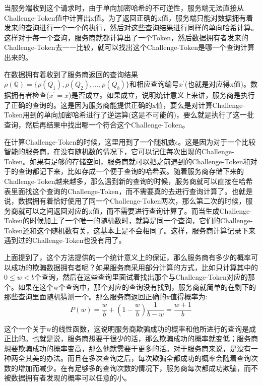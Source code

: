 当服务端收到这个请求时，由于单向加密哈希的不可逆性，服务端无法直接从Challenge-Token值中计算出x值。为了返回正确的x值，服务端只能对数据拥有着发来的查询进行一个一个的执行，然后对这些查询结果进行同样的单向哈希计算。这样对于每一个查询，服务商就都计算出了一个Token，然后数据拥有者发来的Challenge-Token去一一比较，就可以找出这个Challenge-Token是哪一个查询计算出来的。

在数据拥有着收到了服务商返回的查询结果$\rho(\mathbb{Q}) = \{\rho(Q_1), \rho(Q_2), ..., \rho(Q_b)\}$和相应查询编号$x^\prime$(也就是对应得x值)。数据拥有者检查($x^\prime = x$)是否成立。如果成立，说明统计意义上来讲，服务商是执行了正确的查询的。这是因为服务商能提供正确的x值，要么是对计算Challenge-Token用到的单向加密哈希进行了逆运算(这是不可能的)，要么就是执行了这一批查询，然后再结果中找出哪一个符合这个Challenge-Token。

在计算Challenge-Token的时候，这里用到了一个随机数$\epsilon$。这是因为对于一个比较智能的服务商，在没有随机数的情况下，它可以记住每次出现的Challenge-Token。如果有足够的存储空间，服务商就可以把之前遇到的Challenge-Token和对于的查询都记下来，比如存成一个便于查询的哈希表。随着服务商存储下来的Challenge-Token越来越多，那么遇到新的查询的时候，服务商就可以直接在哈希表里面找这个查询的Challenge-Token，而不需要真的去进行查询计算了。也就是说，数据拥有着恰好使用了同一个Challenge-Token两次，那么第二次的时候，服务商就可以之间返回对应的x值，而不需要进行查询计算了。而当生成Challenge-Token的时候加上了一个唯一的随机数时，就算是同一个查询，它们的Challenge-Token还和这个随机数有关，这基本上是不会相同了。这样，服务商计算记录下来遇到过的Challenge-Token也没有用了。

上面提到了，这个方法提供的一个统计意义上的保证，那么服务商有多少的概率可以成功的欺骗数据拥有者呢？如果服务商采用部分计算的方式，比如只计算其中的$0 \le w < b$个查询，然后在这些查询里面试着找出那个与Challenge-Token对应的那个。如果在这个w个查询中，那个对应的查询没有找到，服务商就简单的在剩下的那些查询里面随机猜测一个。那么服务商返回正确的x值得概率为:
\begin{equation} P(w) = \frac{w}{b} + (1 - \frac{w}{b})\frac{1}{b-w} = \frac{w + 1}{b} \end{equation}

这个一个关于w的线性函数，这说明服务商欺骗成功的概率和他所进行的查询是成正比的。也就是说，服务商想要干很少的活，那么欺骗成功的概率就变低；服务商想要欺骗成功的概率变高，那么他就需要干更多的活。对于服务商来说，是没有一种两全其美的办法。而且在多次查询之后，每次欺骗全都成功的概率会随着查询次数的增加而减少。在有足够多的查询次数的情况下，服务商每次都成功欺骗，而不被数据拥有者发现的概率可以任意的小。

